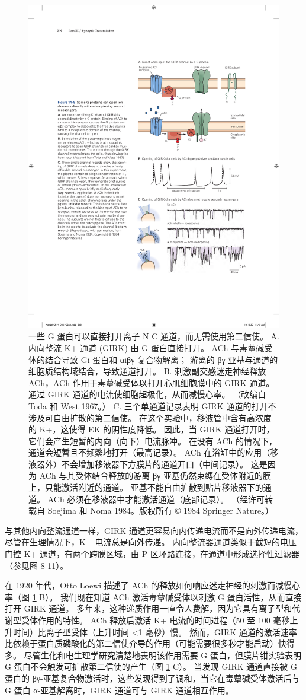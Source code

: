 \begin{figure}[htbp]
	\centering
	\includegraphics[width=0.65\linewidth]{chap14/fig_14_9}
	\caption{一些 G 蛋白可以直接打开离子 N C 通道，而无需使用第二信使。 A. 内向整流 K+ 通道 (GIRK) 由 G 蛋白直接打开。 ACh 与毒蕈碱受体的结合导致 Gi 蛋白和 αiβγ 复合物解离； 游离的 βγ 亚基与通道的细胞质结构域结合，导致通道打开。 B. 刺激副交感迷走神经释放 ACh，ACh 作用于毒蕈碱受体以打开心肌细胞膜中的 GIRK 通道。 通过 GIRK 通道的电流使细胞超极化，从而减慢心率。 （改编自 Toda 和 West 1967。） C. 三个单通道记录表明 GIRK 通道的打开不涉及可自由扩散的第二信使。 在这个实验中，移液管中含有高浓度的 K+，这使得 EK 的阴性度降低。 因此，当 GIRK 通道打开时，它们会产生短暂的内向（向下）电流脉冲。 在没有 ACh 的情况下，通道会短暂且不频繁地打开（最高记录）。 ACh 在浴缸中的应用（移液器外）不会增加移液器下方膜片的通道开口（中间记录）。 这是因为 ACh 与其受体结合释放的游离 βγ 亚基仍然束缚在受体附近的膜上，只能激活附近的通道。 亚基不能自由扩散到贴片移液器下的通道。 ACh 必须在移液器中才能激活通道（底部记录）。 （经许可转载自 Soejima 和 Noma 1984。版权所有 © 1984 Springer Nature。）}
	\label{fig:14_9}
\end{figure}


与其他内向整流通道一样，GIRK 通道更容易向内传递电流而不是向外传递电流，尽管在生理情况下，K+ 电流总是向外传递。 
内向整流器通道类似于截短的电压门控 K+ 通道，有两个跨膜区域，由 P 区环路连接，在通道中形成选择性过滤器（参见图 8-11）。


在 1920 年代，Otto Loewi 描述了 ACh 的释放如何响应迷走神经的刺激而减慢心率（图 \ref{fig:14_9} B）。 
我们现在知道 ACh 激活毒蕈碱受体以刺激 G 蛋白活性，从而直接打开 GIRK 通道。 
多年来，这种递质作用一直令人费解，因为它具有离子型和代谢型受体作用的特性。 
ACh 释放后激活 K+ 电流的时间进程（50 至 100 毫秒上升时间）比离子型受体（上升时间 <1 毫秒）慢。 
然而，GIRK 通道的激活速率比依赖于蛋白质磷酸化的第二信使介导的作用（可能需要很多秒才能启动）快得多。 
尽管生化和电生理学研究清楚地表明该作用需要 G 蛋白，但膜片钳实验表明 G 蛋白不会触发可扩散第二信使的产生（图 \ref{fig:14_9} C）。 
当发现 GIRK 通道直接被 G 蛋白的 βγ-亚基复合物激活时，这些发现得到了调和，当它在毒蕈碱受体激活后与 G 蛋白 α-亚基解离时，GIRK 通道可与 GIRK 通道相互作用。


